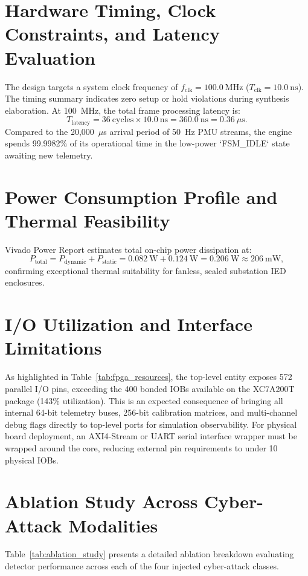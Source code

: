 \documentclass[12pt,a4paper]{report}
\begin{document}
\section{Hardware Timing, Clock Constraints, and Latency Evaluation}
The design targets a system clock frequency of $f_{\text{clk}} = 100.0~\text{MHz}$ ($T_{\text{clk}} = 10.0~\text{ns}$).
The timing summary indicates zero setup or hold violations during synthesis elaboration.
At 100~MHz, the total frame processing latency is:
\begin{equation}
T_{\text{latency}} = 36~\text{cycles} \times 10.0~\text{ns} = 360.0~\text{ns} = 0.36~\mu\text{s}.
\end{equation}
Compared to the 20,000~$\mu$s arrival period of 50~Hz PMU streams, the engine spends 99.9982\%
of its operational time in the low-power `FSM_IDLE` state awaiting new telemetry.

\section{Power Consumption Profile and Thermal Feasibility}
Vivado Power Report estimates total on-chip power dissipation at:
\begin{equation}
P_{\text{total}} = P_{\text{dynamic}} + P_{\text{static}} = 0.082~\text{W} + 0.124~\text{W} = 0.206~\text{W} \approx 206~\text{mW},
\end{equation}
confirming exceptional thermal suitability for fanless, sealed substation IED enclosures.

\section{I/O Utilization and Interface Limitations}
As highlighted in Table~\ref{tab:fpga_resources}, the top-level entity exposes 572 parallel
I/O pins, exceeding the 400 bonded IOBs available on the XC7A200T package (143\% utilization).
This is an expected consequence of bringing all internal 64-bit telemetry buses, 256-bit
calibration matrices, and multi-channel debug flags directly to top-level ports for simulation
observability. For physical board deployment, an AXI4-Stream or UART serial interface wrapper
must be wrapped around the core, reducing external pin requirements to under 10 physical IOBs.

\section{Ablation Study Across Cyber-Attack Modalities}
\label{sec:ablation}
Table~\ref{tab:ablation_study} presents a detailed ablation breakdown evaluating detector
performance across each of the four injected cyber-attack classes.
\end{document}
